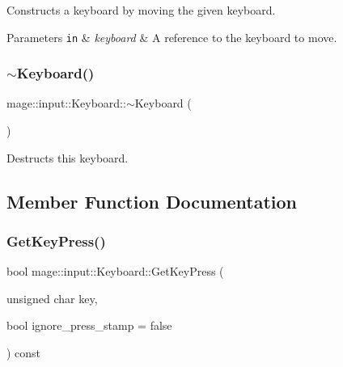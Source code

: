 Constructs a keyboard by moving the given keyboard.


\begin{DoxyParams}[1]{Parameters}
\mbox{\tt in}  & {\em keyboard} & A reference to the keyboard to move. \\
\hline
\end{DoxyParams}
\mbox{\label{classmage_1_1input_1_1_keyboard_a71239cd5326f78ab226f145a430b382b}} 
\subsubsection{\texorpdfstring{$\sim$\+Keyboard()}{~Keyboard()}}
{\footnotesize\ttfamily mage\+::input\+::\+Keyboard\+::$\sim$\+Keyboard (\begin{DoxyParamCaption}{ }\end{DoxyParamCaption})\hspace{0.3cm}{\ttfamily [default]}}

Destructs this keyboard. 

\subsection{Member Function Documentation}
\mbox{\label{classmage_1_1input_1_1_keyboard_a287feaae6c0bf0a93b97f29a601b177a}} 
\subsubsection{\texorpdfstring{Get\+Key\+Press()}{GetKeyPress()}}
{\footnotesize\ttfamily bool mage\+::input\+::\+Keyboard\+::\+Get\+Key\+Press (\begin{DoxyParamCaption}\item[{unsigned char}]{key,  }\item[{bool}]{ignore\+\_\+press\+\_\+stamp = {\ttfamily false} }\end{DoxyParamCaption}) const\hspace{0.3cm}{\ttfamily [noexcept]}}

